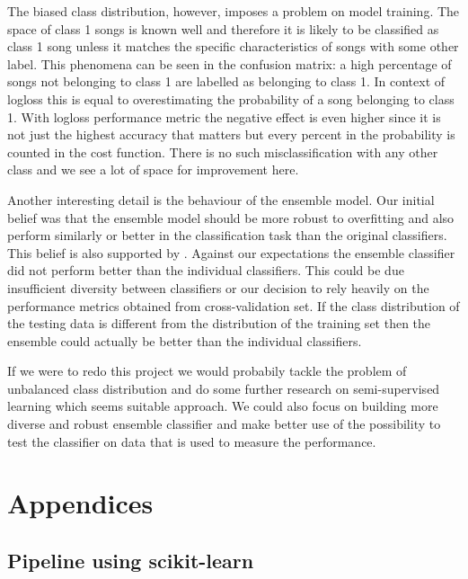 \documentclass[fleqn,10pt]{SelfArx} %
\begin{document}
The biased class distribution, however, imposes a problem on model training. The
space of class 1 songs is known well and therefore it is likely to be
classified as class 1 song unless it matches the specific characteristics of
songs with some other label. This phenomena can be seen in the confusion matrix:
a high percentage of songs not belonging to class 1 are labelled as belonging to
class 1. In context of logloss this is equal to overestimating the probability
of a song belonging to class 1. With logloss performance metric the negative
effect is even higher since it is not just the highest accuracy that matters but
every percent in the probability is counted in the cost function. There is no such
misclassification with any other class and we see a lot of space for improvement here.

Another interesting detail is the behaviour of the ensemble model. Our initial
belief was that the ensemble model should be more robust to overfitting and also
perform similarly or better in the classification task than the original
classifiers. This belief is also supported by \cite{ensembles}. Against our
expectations the ensemble classifier did not perform better than the individual
classifiers. This could be due insufficient diversity between classifiers or our
decision to rely heavily on the performance metrics obtained from
cross-validation set. If the class distribution of the testing data is different
from the distribution of the training set then the ensemble could actually be
better than the individual classifiers.

If we were to redo this project we would probabily tackle the problem of
unbalanced class distribution and do some further research on semi-supervised
learning which seems suitable approach. We could also focus on building more
diverse and robust ensemble classifier and make better use of the possibility to
test the classifier on data that is used to measure the performance.


\section{Appendices}

\subsection{Pipeline using scikit-learn} \label{sklearn-example}
\end{document}
